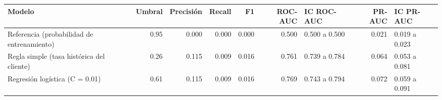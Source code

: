 \begin{tabular}{lrrrrrlrl}
\toprule
Modelo & Umbral & Precisión & Recall & F1 & ROC-AUC & IC ROC-AUC & PR-AUC & IC PR-AUC \\
\midrule
Referencia (probabilidad de entrenamiento) & 0.95 & 0.000 & 0.000 & 0.000 & 0.500 & 0.500 a 0.500 & 0.021 & 0.019 a 0.023 \\
Regla simple (tasa histórica del cliente) & 0.26 & 0.115 & 0.009 & 0.016 & 0.761 & 0.739 a 0.784 & 0.064 & 0.053 a 0.081 \\
Regresión logística (C = 0.01) & 0.61 & 0.115 & 0.009 & 0.016 & 0.769 & 0.743 a 0.794 & 0.072 & 0.059 a 0.091 \\
\bottomrule
\end{tabular}
